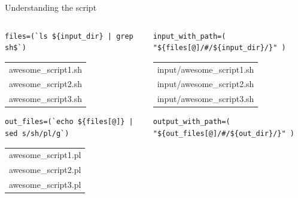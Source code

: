\documentclass[t,10pt]{beamer}
\begin{document}
\begin{frame}[fragile,label={sec:orgheadline24}]{Understanding the script}
 \begin{columns}
\begin{column}{0.5\columnwidth}
\lstset{language=sh,label= ,caption= ,captionpos=b,numbers=none}
\begin{lstlisting}
files=(`ls ${input_dir} | grep sh$`)
\end{lstlisting}

\begin{center}
\begin{tabular}{l}
awesome\_script1.sh\\
awesome\_script2.sh\\
awesome\_script3.sh\\
\end{tabular}
\end{center}

\lstset{language=sh,label= ,caption= ,captionpos=b,numbers=none}
\begin{lstlisting}
out_files=(`echo ${files[@]} | sed s/sh/pl/g`)
\end{lstlisting}

\begin{center}
\begin{tabular}{l}
awesome\_script1.pl\\
awesome\_script2.pl\\
awesome\_script3.pl\\
\end{tabular}
\end{center}
\end{column}

\begin{column}{0.5\columnwidth}
\lstset{language=sh,label= ,caption= ,captionpos=b,numbers=none}
\begin{lstlisting}
input_with_path=( "${files[@]/#/${input_dir}/}" )
\end{lstlisting}

\begin{center}
\begin{tabular}{l}
input/awesome\_script1.sh\\
input/awesome\_script2.sh\\
input/awesome\_script3.sh\\
\end{tabular}
\end{center}

\lstset{language=sh,label= ,caption= ,captionpos=b,numbers=none}
\begin{lstlisting}
output_with_path=( "${out_files[@]/#/${out_dir}/}" )
\end{lstlisting}


\end{column}
\end{columns}
\end{frame}
\end{document}
